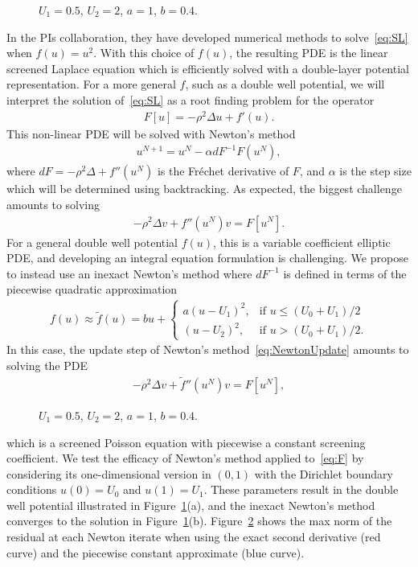 \begin{figure}
  \centering
  
  \caption{\label{fig:well} $U_1 = 0.5$, $U_2 = 2$, $a = 1$, $b = 0.4$.}
\end{figure}
In the PIs collaboration, they have developed numerical methods to
solve~\eqref{eq:SL} when $f(u) = u^2$. With this choice of $f(u)$, the
resulting PDE is the linear screened Laplace equation which is
efficiently solved with a double-layer potential representation. For a
more general $f$, such as a double well potential, we will interpret the
solution of~\eqref{eq:SL} as a root finding problem for the operator
\begin{align}
  \label{eq:F}
  F[u] = -\rho^2 \Delta u + f'(u).
\end{align}
This non-linear PDE will be solved with Newton's method
\begin{align*}
  u^{N+1} = u^{N} - \alpha dF^{-1} F(u^N),
\end{align*}
where $dF = -\rho^2 \Delta + f''(u^N)$ is the Fr\'{e}chet derivative of
$F$, and $\alpha$ is the step size which will be determined using
backtracking. As expected, the biggest challenge amounts to solving
\begin{align}
  \label{eq:NewtonUpdate}
  - \rho^2 \Delta v + f''(u^{N}) v = F[u^N].
\end{align}
For a general double well potential $f(u)$, this is a variable
coefficient elliptic PDE, and developing an integral equation
formulation is challenging. We propose to instead use an inexact
Newton's method where $dF^{-1}$ is defined in terms of the piecewise
quadratic approximation
\begin{align*}
  f(u) \approx \tilde{f}(u) = bu + \begin{cases}
    a(u - U_1)^2, &\mbox{if } u \leq (U_0 + U_1)/2 \\
    (u - U_2)^2, &\mbox{if } u > (U_0 + U_1)/2.
  \end{cases}
\end{align*}
In this case, the update step of Newton's method~\eqref{eq:NewtonUpdate}
amounts to solving the PDE
\begin{align}
  \label{eq:screenedPoisson}
  -\rho^2 \Delta v + \tilde{f}''(u^{N})v = F[u^N],
\end{align}
\begin{figure}
  \centering
  
  \caption{\label{fig:residuals} $U_1 = 0.5$, $U_2 = 2$, $a = 1$, $b =
  0.4$.}
\end{figure}
which is a screened Poisson equation with piecewise a constant screening
coefficient. We test the efficacy of Newton's method applied
to~\eqref{eq:F} by considering its one-dimensional version in $(0,1)$
with the Dirichlet boundary conditions $u(0) = U_0$ and $u(1) = U_1$.
These parameters result in the double well potential illustrated in
Figure~\ref{fig:well}(a), and the inexact Newton's method converges to
the solution in Figure~\ref{fig:well}(b). Figure~\ref{fig:residuals}
shows the max norm of the residual at each Newton iterate when using
the exact second derivative (red curve) and the piecewise constant
approximate (blue curve).


